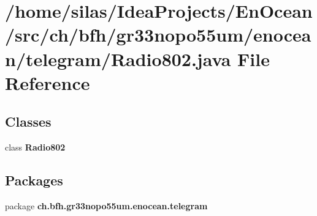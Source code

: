 \section{/home/silas/\+Idea\+Projects/\+En\+Ocean/src/ch/bfh/gr33nopo55um/enocean/telegram/\+Radio802.java File Reference}
\label{Radio802_8java}
\subsection*{Classes}
\begin{DoxyCompactItemize}
\item 
class {\bf Radio802}
\end{DoxyCompactItemize}
\subsection*{Packages}
\begin{DoxyCompactItemize}
\item 
package {\bf ch.\+bfh.\+gr33nopo55um.\+enocean.\+telegram}
\end{DoxyCompactItemize}
